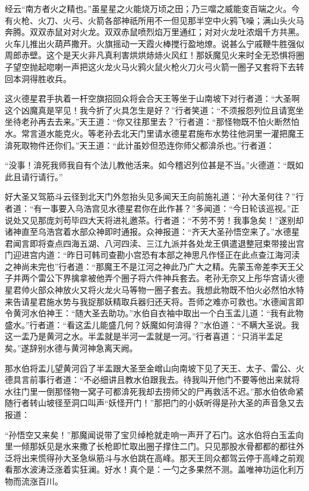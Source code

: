 \documentclass[12pt,UTF8]{ctexbook}
\begin{document}
经云“南方者火之精也。”虽星星之火能烧万顷之田；乃三噹之威能变百端之火。今有火枪、火刀、火弓、火箭各部神祇所用不一但见那半空中火鸦飞噪；满山头火马奔腾。双双赤鼠对对火龙。双双赤鼠喷烈焰万里通红；对对火龙吐浓烟千方共黑。火车儿推出火葫芦撒开。火旗摇动一天霞火棒搅行盈地燎。说甚么宁戚鞭牛胜强似周郎赤壁。这个是天火非凡真利害烘烘焃焃火风红！那妖魔见火来时全无恐惧将圈子望空抛起唿喇一声把这火龙火马火鸦火鼠火枪火刀火弓火箭一圈子又套将下去转回本洞得胜收兵。

这火德星君手执着一杆空旗招回众将会合天王等坐于山南坡下对行者道：“大圣啊这个凶魔真是罕见！我今折了火具怎生是好？”行者笑道：“不须报怨列位且请宽坐坐待老孙再去去来。”天王道：“你又往那里去？”行者道：“那怪物既不怕火断然怕水。常言道水能克火。等老孙去北天门里请水德星君施布水势往他洞里一灌把魔王渰死取物件还你们。”天王道：“此计虽妙但恐连你师父都渰杀也。”行者道：

“没事！渰死我师我自有个法儿教他活来。如今稽迟列位甚是不当。”火德道：“既如此且请行请行。”

好大圣又驾筋斗云径到北天门外忽抬头见多闻天王向前施礼道：“孙大圣何往？”行者道：“有一事要入乌浩宫见水德星君你在此作甚？”多闻道：“今日轮该巡视。”正说处又见那庞刘苟毕四大天将进礼邀茶。行者道：“不劳不劳！我事急矣！”遂别却诸神直至乌浩宫着水部众神即时通报。众神报道：“齐天大圣孙悟空来了。”水德星君闻言即将查点四海五湖、八河四渎、三江九派并各处龙王俱遣退整冠束带接出宫门迎进宫内道：“昨日可韩司查勘小宫恐有本部之神思凡作怪正在此点查江海河渎之神尚未完也”行者道：“那魔王不是江河之神此乃广大之精。先蒙玉帝差李天王父子并两个雷公下界擒拿被他弄个圈子将六件神兵套去。老孙无奈又上彤华宫请火德星君帅火部众神放火又将火龙火马等物一圈子套去。我想此物既不怕火必然怕水特来告请星君施水势与我捉那妖精取兵器归还天将。吾师之难亦可救也。”水德闻言即令黄河水伯神王：“随大圣去助功。”水伯自衣袖中取出一个白玉盂儿道：“我有此物盛水。”行者道：“看这盂儿能盛几何？妖魔如何渰得？”水伯道：“不瞒大圣说。我这一盂乃是黄河之水。半盂就是半河一盂就是一河。”行者喜道：“只消半盂足矣。”遂辞别水德与黄河神急离天阙。

那水伯将盂儿望黄河舀了半盂跟大圣至金嶒山向南坡下见了天王、太子、雷公、火德具言前事行者道：“不必细讲且教水伯跟我去。待我叫开他门不要等他出来就将水往门里一倒那怪物一窝子可都渰死我却去捞师父的尸再救活不迟。”那水伯依命紧随行者转山坡径至洞口叫声“妖怪开门！”那把门的小妖听得是孙大圣的声音急又去报道：

“孙悟空又来矣！”那魔闻说带了宝贝绰枪就走响一声开了石门。这水伯将白玉盂向里一倾那妖见是水来撒了长枪即忙取出圈子撑住二门。只见那股水骨都都的都往外泛将出来慌得孙大圣急纵筋斗与水伯跳在高峰。那天王同众都驾云停于高峰之前观看那水波涛泛涨着实狂澜。好水！真个是：一勺之多果然不测。盖唯神功运化利万物而流涨百川。
\end{document}

